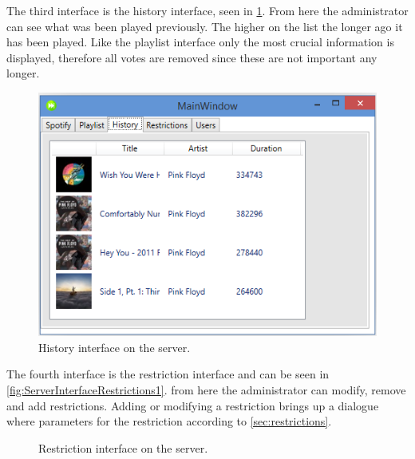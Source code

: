 The third interface is the history interface, seen in \cref{fig:ServerInterfaceHistory}. From here the administrator can see what was been played previously. The higher on the list the longer ago it has been played. Like the playlist interface only the most crucial information is displayed, therefore all votes are removed since these are not important any longer.

\begin{figure}[hbtp]
  \centering
  \includegraphics[width=\textwidth]{Images/ServerInterfaceHistory.png}
  \caption{History interface on the server.}\label{fig:ServerInterfaceHistory}
\end{figure}

The fourth interface is the restriction interface and can be seen in \cref{fig:ServerInterfaceRestrictions1}. from here the administrator can modify, remove and add restrictions. Adding or modifying a restriction brings up a dialogue where parameters for the restriction according to \cref{sec:restrictions}.

\begin{figure}[H]
  \centering
  \caption{Restriction interface on the server.}
\end{figure}

